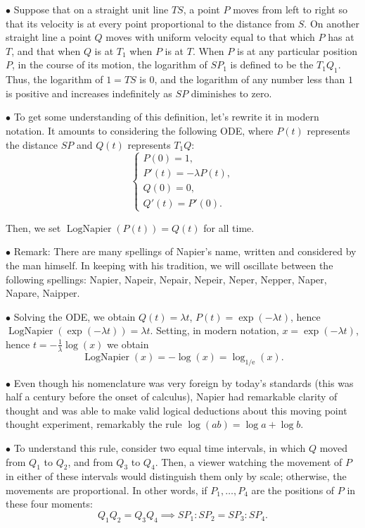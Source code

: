 \documentclass{article}
\newcommand{\e}{\mathrm{e}}
\newcommand\point[1]{\noindent \hspace{\labelsep} $\bullet$ #1 \smallskip}
\DeclareMathOperator{\lognap}{LogNapier}
\begin{document}
\point{Suppose that on a straight unit line $TS$, a point $P$ moves from left to right so that its velocity is at every point proportional to the distance from $S$. On another straight line a point $Q$ moves with uniform velocity equal to that which $P$ has at $T$, and that when $Q$ is at $T_1$ when $P$ is at $T$. When $P$ is at any particular position $P$, in the course of its motion, the logarithm of $SP_1$ is defined to be the $T_1 Q_1$. Thus, the logarithm of $1 = TS$ is $0$, and the logarithm of any number less than $1$ is positive and increases indefinitely as $SP$ diminishes to zero.}

\point{To get some understanding of this definition, let's rewrite it in modern notation. It amounts to considering the following ODE, where $P(t)$ represents the distance $SP$ and $Q(t)$ represents $T_1 Q$:
\begin{equation}
\begin{cases}
P(0) = 1,\\
P'(t) = -\lambda P(t),\\
Q(0) = 0,\\
Q'(t) = P'(0).
\end{cases}
\end{equation}

Then, we set $\lognap(P(t)) = Q(t)$ for all time.}

\point{Remark: There are many spellings of Napier's name, written and considered by the man himself. In keeping with his tradition, we will oscillate between the following spellings: Napier, Napeir, Nepair, Nepeir, Neper, Nepper, Naper, Napare, Naipper.}

\point{Solving the ODE, we obtain $Q(t) = \lambda t$, $P(t) = \exp(-\lambda t)$, hence $\lognap(\exp(-\lambda t)) = \lambda t$. Setting, in modern notation, $x = \exp(-\lambda t)$, hence $t = -\frac1\lambda \log(x)$ we obtain
\begin{equation}
\lognap(x) = -\log(x) = \log_{1/\e}(x).
\end{equation}}

\point{Even though his nomenclature was very foreign by today's standards (this was half a century before the onset of calculus), Napier had remarkable clarity of thought and was able to make valid logical deductions about this moving point thought experiment, remarkably the rule $\log(ab) = \log a + \log b$.}

\point{To understand this rule, consider two equal time intervals, in which $Q$ moved from $Q_1$ to $Q_2$, and from $Q_3$ to $Q_4$. Then, a viewer watching the movement of $P$ in either of these intervals would distinguish them only by scale; otherwise, the movements are proportional. In other words, if $P_1, \dots, P_4$ are the positions of $P$ in these four moments:
\begin{equation}
Q_1 Q_2 = Q_3 Q_4 \implies SP_1 : SP_2 = SP_3 : SP_4.
\end{equation}}
\end{document}
